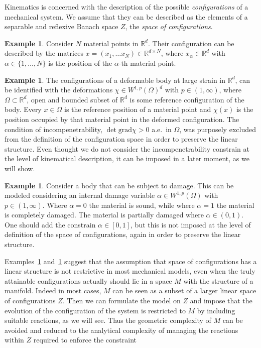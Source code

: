 \documentclass[a4paper,10pt,twoside]{amsbook}
\numberwithin{section}{chapter}
\numberwithin{equation}{chapter}
\theoremstyle{definition}
\newtheorem{ex}[prop]{Example}
\begin{document}
Kinematics is concerned with the description of the possible \emph{configurations} of a mechanical system. We assume that they can be described as the elements of a separable and reflexive Banach space $Z$, the \emph{space of configurations}.
\begin{ex}
\label{ex:modeling:particles}
Consider $N$ material points in $\mathbb{R}^d$. Their configuration can be described by the matrices $x=(x_1,\dots x_N)\in\mathbb{R}^{d\times N}$, where $x_{\alpha}\in\mathbb{R}^d$ with $\alpha\in\{1,\dots,N\}$ is the position of the $\alpha$-th material point.
\end{ex}
\begin{ex}
\label{ex:modeling:large-strain}
The configurations of a deformable body at large strain in $\mathbb{R}^d$, can be identified with the deformations $\chi\in W^{1,p}(\Omega)^d$ with $p\in(1,\infty)$, where $\Omega\subset\mathbb{R}^d$, open and bounded subset of $\mathbb{R}^d$ is some reference configuration of the body. Every $x\in\Omega$ is the reference position of a material point and $\chi(x)$ is the position occupied by that material point in the deformed configuration. The condition of incompenetrability, $\det\text{grad}\chi>0$ a.e.\ in $\Omega$, was purposely excluded from the definition of the configuration space in order to preserve the linear structure. Even thought we do not consider the incompenetrability constrain at the level of kinematical description, it can be imposed in a later moment, as we will show.
\end{ex}
\begin{ex}
\label{ex:modeling:micro}
Consider a body that can be subject to damage. This can be modeled considering an internal damage variable $\alpha\in W^{1,p}(\Omega)$ with $p\in(1,\infty)$. Where $\alpha=0$ the material is sound, while where $\alpha=1$ the material is completely damaged. The material is partially damaged where $\alpha\in(0,1)$. One should add the constrain $\alpha\in[0,1]$, but this is not imposed at the level of definition of the space of configurations, again in order to preserve the linear structure.
\end{ex}
Examples~\ref{ex:modeling:large-strain} and~\ref{ex:modeling:micro} suggest that the assumption that space of configurations has a linear structure is not restrictive in most mechanical models, even when the truly attainable configurations actually should lie in a space $M$ with the structure of a manifold. Indeed in most cases, $M$ can be seen as a subset of a larger linear space of configurations $Z$. Then we can formulate the model on $Z$ and impose that the evolution of the configuration of the system is restricted to $M$ by including suitable reactions, as we will see. Thus the geometric complexity of $M$ can be avoided and reduced to the analytical complexity of managing the reactions within $Z$ required to enforce the constraint
\end{document}
